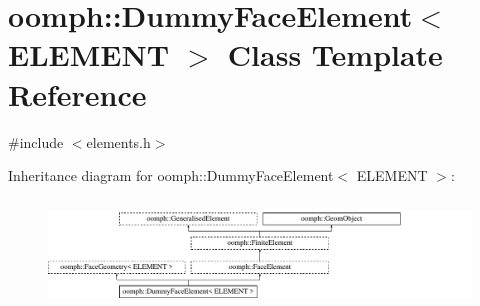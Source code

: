 \hypertarget{classoomph_1_1DummyFaceElement}{}\section{oomph\+:\+:Dummy\+Face\+Element$<$ E\+L\+E\+M\+E\+NT $>$ Class Template Reference}
\label{classoomph_1_1DummyFaceElement}


{\ttfamily \#include $<$elements.\+h$>$}

Inheritance diagram for oomph\+:\+:Dummy\+Face\+Element$<$ E\+L\+E\+M\+E\+NT $>$\+:\begin{figure}[H]
\begin{center}
\leavevmode
\includegraphics[height=2.882883cm]{classoomph_1_1DummyFaceElement}
\end{center}
\end{figure}

